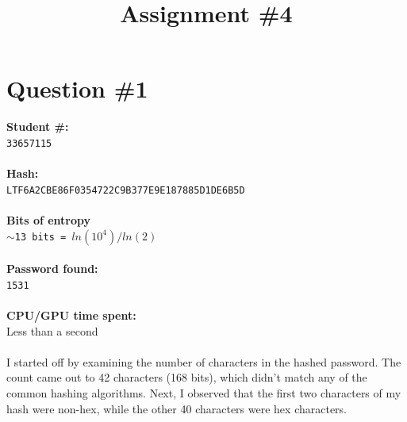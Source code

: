 \documentclass[conference]{IEEEtran}
\begin{document}
\raggedbottom

%
\title{Assignment \#4}
\author{
}


\maketitle

\section{Question \#1}

\noindent\textbf{Student \#:}\\
\texttt{33657115}
\\\\
\textbf{Hash:}\\
\texttt{LTF6A2CBE86F0354722C9B377E9E187885D1DE6B5D}\\\\
\textbf{Bits of entropy}\\
\texttt{$\sim$13 bits = $ln(10^4)/ln(2)$}\\\\
\textbf{Password found:}\\
\texttt{1531}\\\\
\textbf{CPU/GPU time spent:}\\
Less than a second
\\\\

I started off by examining the number of characters in the hashed password. The count came out to 42 characters (168 bits), which didn't match any of the common hashing algorithms. Next, I observed that the first two characters of my hash were non-hex, while the other 40 characters were hex characters.\\
\end{document}
